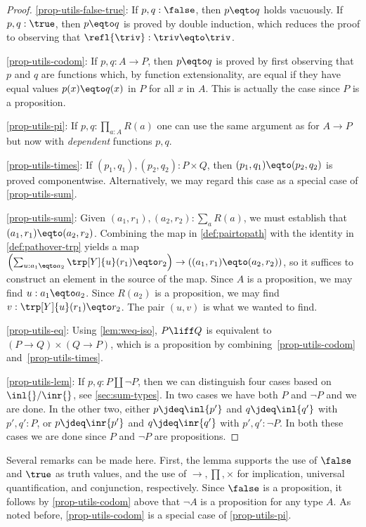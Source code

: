 \begin{proof}
\ref{prop-utils-false-true}:
If $p,q : \false$, then $p \eqto q$ holds vacuously.
If $p,q : \true$, then $p \eqto q$ is proved by double induction,
which reduces the proof to observing that $\refl{\triv}: \triv \eqto \triv$.

\ref{prop-utils-codom}:
If $p,q : A\to P$, then $p \eqto q$ is proved by first observing that $p$ and $q$
are functions which, by function extensionality, are equal if they have
equal values $p(x) \eqto q(x)$ in $P$ for all $x$ in $A$. This is
actually the case since $P$ is a proposition.

\ref{prop-utils-pi}:
If $p,q : \prod_{a:A} R(a)$ one can use the same argument as for $A\to P$
but now with \emph{dependent} functions $p,q$.

\ref{prop-utils-times}:
If $(p_1,q_1),(p_2,q_2) : P\times Q$, then $(p_1,q_1) \eqto (p_2,q_2)$
is proved componentwise.  Alternatively, we may regard this case as a special case of \ref{prop-utils-sum}.

\ref{prop-utils-sum}:
Given $(a_1,r_1), (a_2,r_2) : \sum_a R(a)$, we must establish that $(a_1,r_1) \eqto (a_2,r_2)$.  Combining the map in \cref{def:pairtopath} with the
identity in \cref{def:pathover-trp} yields a map $ \left( \sum_{u : a_1 \eqto a_2} \trp[Y]{u}(r_1) \eqto r_2 \right) \to \left( (a_1,r_1) \eqto (a_2,r_2)
\right)$, so it suffices to construct an element in the source of the map.  Since $A$ is a proposition, we may find $u : a_1 \eqto a_2$.  Since
$R(a_2)$ is a proposition, we may find $v : \trp[Y]{u}(r_1) \eqto r_2$.  The pair $(u,v)$ is what we wanted to find.

\ref{prop-utils-eq}:
Using \cref{lem:weq-iso}, $P \liff Q$ is equivalent to
$(P\to Q)\times(Q\to P)$, which is a proposition by
combining~\ref{prop-utils-codom} and~\ref{prop-utils-times}.

\ref{prop-utils-lem}:
If $p,q : P\amalg \neg P$, then we can distinguish four cases
based on $\inl{}/\inr{}$, see \cref{sec:sum-types}. In two cases
we have both $P$ and $\neg P$ and we are done. In the other two,
either $p\jdeq \inl{p'}$ and $q\jdeq \inl{q'}$ with $p',q':P$,
or $p\jdeq \inr{p'}$ and $q\jdeq \inr{q'}$ with $p',q':\neg P$.
In both these cases we are done since $P$ and $\neg P$
are propositions.
\end{proof}

Several remarks can be made here. First, the lemma supports the
use of $\false$ and $\true$ as truth values, and the use of
$\to,\prod,\times$ for implication, universal quantification,
and conjunction, respectively. Since $\false$ is a proposition,
it follows by \ref{prop-utils-codom} above that
$\neg A$ is a proposition for any type $A$.
As noted before, \ref{prop-utils-codom} is a
special case of \ref{prop-utils-pi}.

